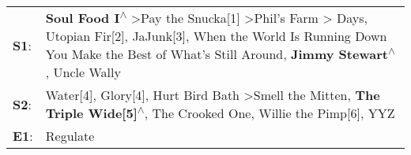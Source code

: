 \begin{supertabular}{p{0.03\textwidth}p{0.92\textwidth}}
 \textbf{S1}:  &  \textbf{Soul Food I\textsuperscript{$\wedge$}} \textgreater \enspace Pay the Snucka[1]\textsuperscript{} \textgreater \enspace Phil's Farm\textsuperscript{} \textgreater {} Days\textsuperscript{}, \enspace Utopian Fir[2]\textsuperscript{}, \enspace JaJunk[3]\textsuperscript{}, \enspace When the World Is Running Down You Make the Best of What's Still Around\textsuperscript{}, \enspace \textbf{Jimmy Stewart\textsuperscript{$\wedge$}}, \enspace Uncle Wally\textsuperscript{}  \enspace  \\
 \textbf{S2}:  &                                                                                                                                        Water[4]\textsuperscript{}, \enspace Glory[4]\textsuperscript{}, \enspace Hurt Bird Bath\textsuperscript{} \textgreater \enspace Smell the Mitten\textsuperscript{}, \enspace \textbf{The Triple Wide[5]\textsuperscript{$\wedge$}}, \enspace The Crooked One\textsuperscript{}, \enspace Willie the Pimp[6]\textsuperscript{}, \enspace YYZ\textsuperscript{}  \enspace  \\
 \textbf{E1}:  &                                                                                                                                                                                                                                                                                                                                                                                                                                                                            Regulate\textsuperscript{}  \enspace  \\
\end{supertabular}
